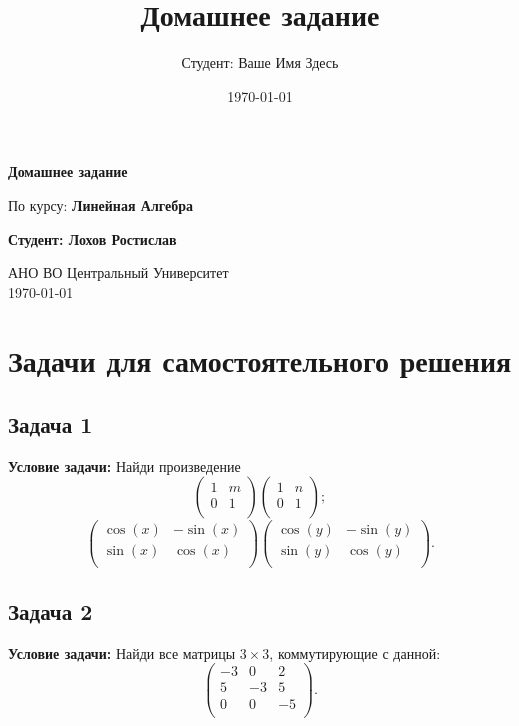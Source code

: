\documentclass[a4paper,12pt]{article}
\title{Домашнее задание}
\author{Студент: Ваше Имя Здесь}
\date{\today}
\begin{document}
\begin{titlepage}
    \centering
    \vspace*{1cm}

    \Huge
    \textbf{Домашнее задание}

    \vspace{0.5cm}
    \LARGE
    По курсу: \textbf{Линейная Алгебра}

    \vspace{1.5cm}

    \textbf{Студент: Лохов Ростислав}

    \vfill

    \Large
    АНО ВО Центральный Университет\\
    \vspace{0.3cm}
    \today

\end{titlepage}

\tableofcontents
\newpage

\section{Задачи для самостоятельного решения}

\subsection{Задача 1}
\textbf{Условие задачи:}
Найди произведение
\[
\left( \begin{array}{cc}
1 & m \\
0 & 1 \\
\end{array} \right)
\left( \begin{array}{cc}
1 & n \\
0 & 1 \\
\end{array} \right);
\]
\[
\left( \begin{array}{cc}
\cos(x) & -\sin(x) \\
\sin(x) & \cos(x) \\
\end{array} \right)
\left( \begin{array}{cc}
\cos(y) & -\sin(y) \\
\sin(y) & \cos(y) \\
\end{array} \right).
\]

\subsection{Задача 2}
\textbf{Условие задачи:}
Найди все матрицы $3 \times 3$, коммутирующие с данной:
\[
\begin{pmatrix}
-3 & 0 & 2 \\
5 & -3 & 5 \\
0 & 0 & -5 \\
\end{pmatrix}.
\]
\end{document}

